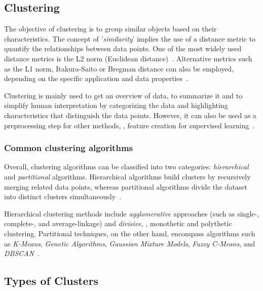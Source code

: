 \documentclass[10pt,twocolumn,letterpaper]{article}
\begin{document}
\subsection{Clustering}\label{subsec:clustering}

The objective of clustering is to group similar objects based on their
characteristics. The concept of '\textit{similarity}' implies the use of a
distance metric to quantify the relationships between data points. One of the
most widely used distance metrics is the L2 norm (Euclidean
distance)~\cite{deuschle2019}. Alternative metrics such as the L1 norm,
Itakura-Saito or Bregman distance can also be employed, depending on the
specific application and data properties~\cite{Jain2010651}.

Clustering is mainly used to get an overview of data, to summarize it and to
simplify human interpretation by categorizing the data and highlighting
characteristics that distinguish the data points. However, it can also be used
as a preprocessing step for other methods, \eg, feature creation for supervised
learning~\cite{Jain2010651}.


\subsubsection{Common clustering algorithms}\label{subsubsec:common-clustering-algorithms}

Overall, clustering algorithms can be classified into two categories:
\textit{hierarchical} and \textit{partitional} algorithms. Hierarchical
algorithms build clusters by recursively merging related data points, whereas
partitional algorithms divide the dataset into distinct clusters
simultaneously~\cite{Ezugwu2022104743,Jain2010651}.

Hierarchical clustering methods include \textit{agglomerative} approaches (such
as single-, complete-, and average-linkage) and \textit{divisive}, \eg,
monothetic and polythetic clustering. Partitional techniques, on the other
hand, encompass algorithms such as \textit{K-Means}, \textit{Genetic
    Algorithms}, \textit{Gaussian Mixture Models}, \textit{Fuzzy C-Means}, and
\textit{DBSCAN}~\cite{Ezugwu2022104743}.


\subsection{Types of Clusters}\label{subsec:types-of-clusters}
\end{document}
